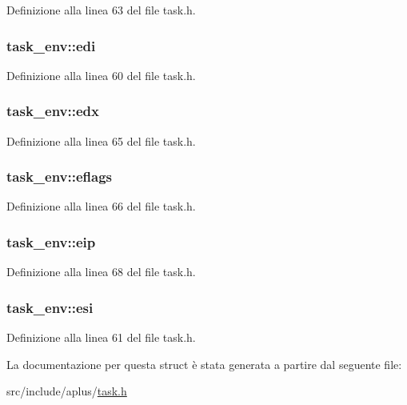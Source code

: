 Definizione alla linea 63 del file task.\+h.

\hypertarget{structtask__env_afd28f73e49aab123e4c2a5f149f10fe2}{
\subsubsection[{edi}]{ task\+\_\+env\+::edi}}\label{structtask__env_afd28f73e49aab123e4c2a5f149f10fe2}


Definizione alla linea 60 del file task.\+h.

\hypertarget{structtask__env_ab76a643115c795f2f9feb5582ea29497}{
\subsubsection[{edx}]{ task\+\_\+env\+::edx}}\label{structtask__env_ab76a643115c795f2f9feb5582ea29497}


Definizione alla linea 65 del file task.\+h.

\hypertarget{structtask__env_a1eeaac73d44a6550af32a9dd726935e5}{
\subsubsection[{eflags}]{ task\+\_\+env\+::eflags}}\label{structtask__env_a1eeaac73d44a6550af32a9dd726935e5}


Definizione alla linea 66 del file task.\+h.

\hypertarget{structtask__env_ae6f3defc8a0fe9512785fdfd2eedd07d}{
\subsubsection[{eip}]{ task\+\_\+env\+::eip}}\label{structtask__env_ae6f3defc8a0fe9512785fdfd2eedd07d}


Definizione alla linea 68 del file task.\+h.

\hypertarget{structtask__env_a4bae98183ee224f67097a00d887a229b}{
\subsubsection[{esi}]{ task\+\_\+env\+::esi}}\label{structtask__env_a4bae98183ee224f67097a00d887a229b}


Definizione alla linea 61 del file task.\+h.



La documentazione per questa struct è stata generata a partire dal seguente file\+:\begin{DoxyCompactItemize}
\item 
src/include/aplus/\hyperlink{task_8h}{task.\+h}\end{DoxyCompactItemize}

